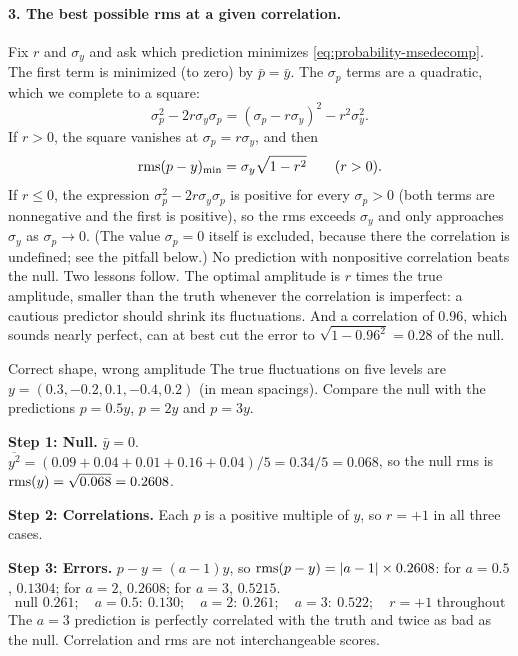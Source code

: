\paragraph{3. The best possible rms at a given correlation.} Fix $r$ and $\sigma_y$ and ask which prediction minimizes \cref{eq:probability-msedecomp}. The first term is minimized (to zero) by $\bar p=\bar y$. The $\sigma_p$ terms are a quadratic, which we complete to a square:
\[
\sigma_p^2-2r\sigma_y\sigma_p = (\sigma_p-r\sigma_y)^2 - r^2\sigma_y^2 .
\]
If $r>0$, the square vanishes at $\sigma_p=r\sigma_y$, and then
\begin{equation}
\mathrm{rms}(p-y)_{\min} = \sigma_y\sqrt{1-r^2}\qquad(r>0).
\label{eq:probability-bestrms}
\end{equation}
If $r\le0$, the expression $\sigma_p^2-2r\sigma_y\sigma_p$ is positive for every $\sigma_p>0$ (both terms are nonnegative and the first is positive), so the rms exceeds $\sigma_y$ and only approaches $\sigma_y$ as $\sigma_p\to0$. (The value $\sigma_p=0$ itself is excluded, because there the correlation is undefined; see the pitfall below.) No prediction with nonpositive correlation beats the null. Two lessons follow. The optimal amplitude is $r$ times the true amplitude, smaller than the truth whenever the correlation is imperfect: a cautious predictor should shrink its fluctuations. And a correlation of 0.96, which sounds nearly perfect, can at best cut the error to $\sqrt{1-0.96^2}=0.28$ of the null.

\begin{sample}{Correct shape, wrong amplitude}
The true fluctuations on five levels are $y=(0.3,-0.2,0.1,-0.4,0.2)$ (in mean spacings). Compare the null with the predictions $p=0.5y$, $p=2y$ and $p=3y$.

\textbf{Step 1: Null.} $\bar y=0$. $\overline{y^2}=(0.09+0.04+0.01+0.16+0.04)/5=0.34/5=0.068$, so the null rms is $\mathrm{rms}(y)=\sqrt{0.068}=0.2608$.

\textbf{Step 2: Correlations.} Each $p$ is a positive multiple of $y$, so $r=+1$ in all three cases.

\textbf{Step 3: Errors.} $p-y=(a-1)y$, so $\mathrm{rms}(p-y)=\left\lvert a-1\right\rvert\times0.2608$: for $a=0.5$, $0.1304$; for $a=2$, $0.2608$; for $a=3$, $0.5215$.
\[
\boxed{\text{null }0.261;\quad a=0.5:\ 0.130;\quad a=2:\ 0.261;\quad a=3:\ 0.522;\quad r=+1\text{ throughout}}
\]
The $a=3$ prediction is perfectly correlated with the truth and twice as bad as the null. Correlation and rms are not interchangeable scores.
\end{sample}

